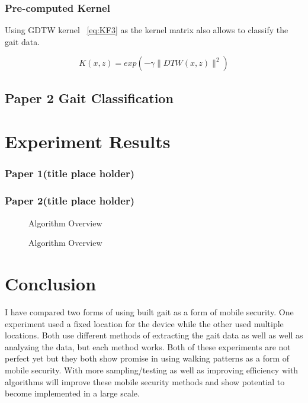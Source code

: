 \documentclass{sig-alternate}
\begin{document}
\subsubsection{Pre-computed Kernel}
Using GDTW kernel ~\ref{eq:KF3} as the kernel matrix also allows to classify the gait data.

\begin{displaymath}
K(x,z)=exp(-\gamma \parallel DTW(x,z) \parallel ^2)
\label{eq:KF3}
\end{displaymath}

\subsection{Paper 2 Gait Classification}

\section{Experiment Results}
\subsubsection{Paper 1(title place holder)}
\subsubsection{Paper 2(title place holder)}

\begin{figure}
\centering
{}
\caption{Algorithm Overview}
\label{fig:Paper1Summary}
\end{figure}

\begin{figure*}
\centering
{}
\caption{Algorithm Overview}
\label{fig:Paper2Summary}
\end{figure*}

\section{Conclusion}
I have compared two forms of using built gait as a form of mobile security. One experiment used a fixed location for the device while the other used multiple locations. Both use different methods of extracting the gait data as well as well as analyzing the data, but each method works. Both of these experiments are not perfect yet but they both show promise in using walking patterns as a form of mobile security. With more sampling/testing as well as improving efficiency with algorithms will improve these mobile security methods and show potential to become implemented in a large scale.
\end{document}
